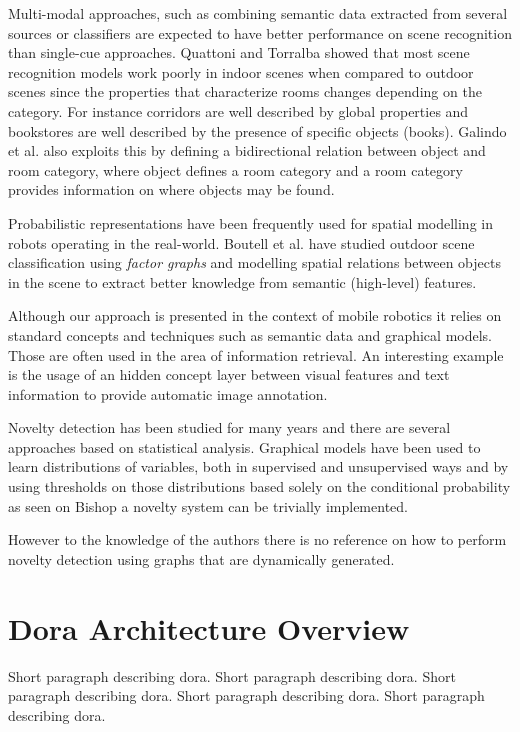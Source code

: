 \documentclass[runningheads,a4paper]{llncs}
\begin{document}
Multi-modal approaches, such as combining semantic data extracted from
several sources or classifiers are expected to have better performance on scene
recognition than single-cue approaches. Quattoni and Torralba\cite{quattoni2009recognizing}
showed that most scene recognition models work poorly in indoor scenes when
compared to outdoor scenes since the properties that
characterize rooms changes depending on the category. For instance corridors are well
described by global properties and bookstores are well described by the presence of
specific objects (books).
Galindo et al.\cite{galindo2005multi} also exploits this by defining a bidirectional relation
between object and room category, where object defines a room category and a room
category provides information on where objects may be found.

Probabilistic representations have been frequently used for spatial modelling
in robots operating in the real-world\cite{gross2009toomas,maierprobabilistic}.
Boutell et al.\cite{boutell2006factor} have studied outdoor scene classification using
\emph{factor graphs} and modelling spatial relations between objects in the scene
to extract better knowledge from semantic (high-level) features.

Although our approach is presented in the context of mobile robotics it relies on
standard concepts and techniques such as semantic data and graphical models.
Those are often used in the area of information retrieval.
An interesting example is the usage of an hidden concept layer between visual features
and text information to provide automatic image annotation\cite{zhang2005probabilistic}.

Novelty detection has been studied for many years and there are several approaches
based on statistical analysis\cite{markou2003novelty}.
Graphical models have been used to learn distributions of variables, both in
supervised and unsupervised ways and by using thresholds on those distributions
based solely on the conditional probability as seen on Bishop\cite{bishop1994novelty}
a novelty system can be trivially implemented.

However to the knowledge of the authors there is no reference on how to perform
novelty detection using graphs that are dynamically generated.

\section{Dora Architecture Overview}
Short paragraph describing dora. Short paragraph describing dora. Short paragraph describing dora. Short paragraph describing dora. Short paragraph describing dora.
\end{document}
